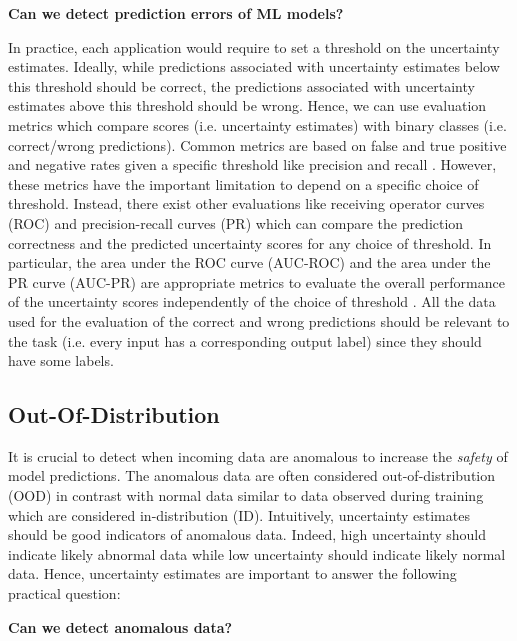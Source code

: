 \begin{center}
    \textbf{Can we detect prediction errors of ML models?}
\end{center}

In practice, each application would require to set a threshold on the uncertainty estimates. Ideally, while predictions associated with uncertainty estimates below this threshold should be correct, the predictions associated with uncertainty estimates above this threshold should be wrong. Hence, we can use evaluation metrics which compare scores (i.e. uncertainty estimates) with binary classes (i.e. correct/wrong predictions). Common metrics are based on false and true positive and negative rates given a specific threshold like precision and recall . However, these metrics have the important limitation to depend on a specific choice of threshold. Instead, there exist other evaluations like receiving operator curves (ROC) and precision-recall curves (PR) which can compare the prediction correctness and the predicted uncertainty scores for any choice of threshold. In particular, the area under the ROC curve (AUC-ROC) and the area under the PR curve (AUC-PR) are appropriate metrics to evaluate the overall performance of the uncertainty scores independently of the choice of threshold \cite{apr_auroc}. All the data used for the evaluation of the correct and wrong predictions should be relevant to the task (i.e. every input has a corresponding output label) since they should have some labels.

\subsection{Out-Of-Distribution}

It is crucial to detect when incoming data are anomalous to increase the \emph{safety} of model predictions. The anomalous data are often considered out-of-distribution (OOD) in contrast with normal data similar to data observed during training which are considered in-distribution (ID). Intuitively, uncertainty estimates should be good indicators of anomalous data. Indeed, high uncertainty should indicate likely abnormal data while low uncertainty should indicate likely normal data. Hence, uncertainty estimates are important to answer the following practical question:

\begin{center}
    \textbf{Can we detect anomalous data?}
\end{center}


